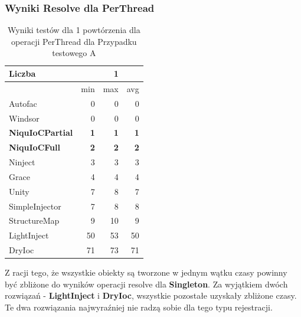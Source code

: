 \documentclass[12pt]{article}
\begin{document}
\subsubsection{Wyniki Resolve dla PerThread}
\begin{table}[H]
\captionsetup{belowskip=0pt,aboveskip=0pt}
\begin{center}
\begin{small}
	\begin{tabular}{ | l | r r r | }
    		\hline
Liczba & & 1 & \\ \hline
 & min & max & avg \\ \hline
Autofac & 0 & 0 & 0 \\ \hline
Windsor & 0 & 0 & 0 \\ \hline
\textbf{NiquIoCPartial} & \textbf{1} & \textbf{1} & \textbf{1} \\ \hline
\textbf{NiquIoCFull} & \textbf{2} & \textbf{2} & \textbf{2} \\ \hline
Ninject & 3 & 3 & 3 \\ \hline
Grace & 4 & 4 & 4 \\ \hline
Unity & 7 & 8 & 7 \\ \hline
SimpleInjector & 7 & 8 & 8 \\ \hline
StructureMap & 9 & 10 & 9 \\ \hline
LightInject & 50 & 53 & 50 \\ \hline
DryIoc & 71 & 73 & 71 \\ \hline
  	\end{tabular}
\end{small}
\end{center}
\caption{Wyniki testów dla 1 powtórzenia dla operacji PerThread dla Przypadku testowego A}
\label{TestCaseA_PerThread1}
\end{table}
Z racji tego, że wszystkie obiekty są tworzone w jednym wątku czasy powinny być zbliżone do wyników operacji resolve dla \textbf{Singleton}. Za wyjątkiem dwóch rozwiązań - \textbf{LightInject} i \textbf{DryIoc}, wszystkie pozostałe uzyskały zbliżone czasy. Te dwa rozwiązania najwyraźniej nie radzą sobie dla tego typu rejestracji.
\\ \\
\end{document}
